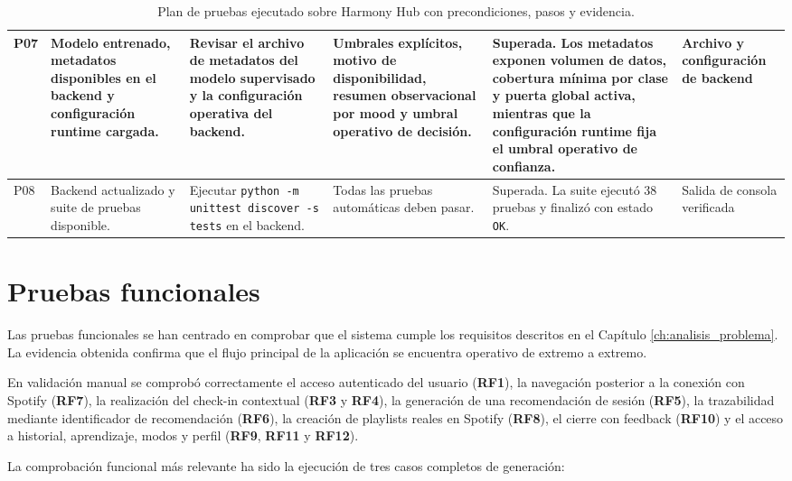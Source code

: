 \begin{table}[H]
\begin{tabularx}{\textwidth}{|P{0.9cm}|P{2.2cm}|Y|P{2.4cm}|P{2.8cm}|P{1.9cm}|}
\hline
P07 & Modelo entrenado, metadatos disponibles en el backend y configuración runtime cargada. & Revisar el archivo de metadatos del modelo supervisado y la configuración operativa del backend. & Umbrales explícitos, motivo de disponibilidad, resumen observacional por mood y umbral operativo de decisión. & Superada. Los metadatos exponen volumen de datos, cobertura mínima por clase y puerta global activa, mientras que la configuración runtime fija el umbral operativo de confianza. & Archivo \texttt{} y configuración de backend \\
\hline
P08 & Backend actualizado y suite de pruebas disponible. & Ejecutar \texttt{python -m unittest discover -s tests} en el backend. & Todas las pruebas automáticas deben pasar. & Superada. La suite ejecutó 38 pruebas y finalizó con estado \texttt{OK}. & Salida de consola verificada \\
\hline
\end{tabularx}
\caption{Plan de pruebas ejecutado sobre Harmony Hub con precondiciones, pasos y evidencia.}
\label{tab:plan_pruebas}
\end{table}

\section{Pruebas funcionales}
\label{sec:pruebas_funcionales}

Las pruebas funcionales se han centrado en comprobar que el sistema cumple los
requisitos descritos en el Capítulo \ref{ch:analisis_problema}. La evidencia
obtenida confirma que el flujo principal de la aplicación se encuentra operativo
de extremo a extremo.

En validación manual se comprobó correctamente el acceso autenticado del usuario
(\textbf{RF1}), la navegación posterior a la conexión con Spotify
(\textbf{RF7}), la realización del check-in contextual (\textbf{RF3} y
\textbf{RF4}), la generación de una recomendación de sesión (\textbf{RF5}), la
trazabilidad mediante identificador de recomendación (\textbf{RF6}), la
creación de playlists reales en Spotify (\textbf{RF8}), el cierre con feedback
(\textbf{RF10}) y el acceso a historial, aprendizaje, modos y perfil
(\textbf{RF9}, \textbf{RF11} y \textbf{RF12}).

La comprobación funcional más relevante ha sido la ejecución de tres casos
completos de generación:


